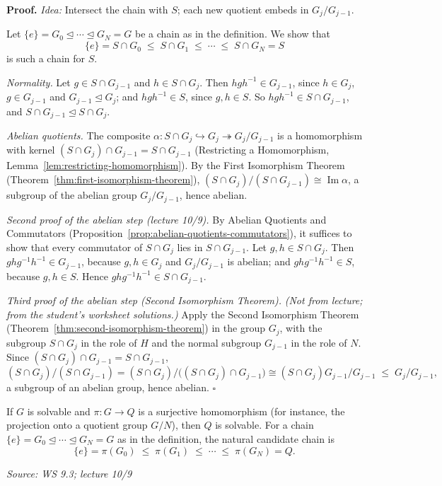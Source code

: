 \documentclass[11pt]{report}
\renewenvironment{proof}[1][Proof]{\noindent\textbf{#1.} }{\hfill$\square$\par\vspace{5pt}}
\newcommand{\srcline}[1]{\par\hfill{\footnotesize\textit{Source: #1}}}
\begin{document}
\begin{proof}
\textit{Idea:} Intersect the chain with $S$; each new quotient embeds in $G_j/G_{j-1}$.\par
Let $\{e\} = G_0 \trianglelefteq \cdots \trianglelefteq G_N = G$ be a chain as in the definition. We show that
\[ \{e\} = S \cap G_0 \;\leq\; S \cap G_1 \;\leq\; \cdots \;\leq\; S \cap G_N = S \]
is such a chain for $S$.

\emph{Normality.} Let $g \in S \cap G_{j-1}$ and $h \in S \cap G_j$. Then $hgh^{-1} \in G_{j-1}$, since $h \in G_j$, $g \in G_{j-1}$ and $G_{j-1} \trianglelefteq G_j$; and $hgh^{-1} \in S$, since $g, h \in S$. So $hgh^{-1} \in S \cap G_{j-1}$, and $S \cap G_{j-1} \trianglelefteq S \cap G_j$.

\emph{Abelian quotients.} The composite $\alpha: S \cap G_j \hookrightarrow G_j \twoheadrightarrow G_j/G_{j-1}$ is a homomorphism with kernel $(S \cap G_j) \cap G_{j-1} = S \cap G_{j-1}$ (Restricting a Homomorphism, Lemma~\ref{lem:restricting-homomorphism}). By the First Isomorphism Theorem (Theorem~\ref{thm:first-isomorphism-theorem}), $(S \cap G_j)/(S \cap G_{j-1}) \cong \operatorname{Im}\alpha$, a subgroup of the abelian group $G_j/G_{j-1}$, hence abelian.

\emph{Second proof of the abelian step (lecture 10/9).} By Abelian Quotients and Commutators (Proposition~\ref{prop:abelian-quotients-commutators}), it suffices to show that every commutator of $S \cap G_j$ lies in $S \cap G_{j-1}$. Let $g, h \in S \cap G_j$. Then $ghg^{-1}h^{-1} \in G_{j-1}$, because $g, h \in G_j$ and $G_j/G_{j-1}$ is abelian; and $ghg^{-1}h^{-1} \in S$, because $g, h \in S$. Hence $ghg^{-1}h^{-1} \in S \cap G_{j-1}$.

\emph{Third proof of the abelian step (Second Isomorphism Theorem).} \textit{(Not from lecture; from the student's worksheet solutions.)} Apply the Second Isomorphism Theorem (Theorem~\ref{thm:second-isomorphism-theorem}) in the group $G_j$, with the subgroup $S \cap G_j$ in the role of $H$ and the normal subgroup $G_{j-1}$ in the role of $N$. Since $(S \cap G_j) \cap G_{j-1} = S \cap G_{j-1}$,
\[ (S \cap G_j)/(S \cap G_{j-1}) = (S \cap G_j)\big/\big((S \cap G_j) \cap G_{j-1}\big) \cong (S \cap G_j)G_{j-1}/G_{j-1} \;\leq\; G_j/G_{j-1}, \]
a subgroup of an abelian group, hence abelian.
\end{proof}

\begin{propbox}\label{prop:quotients-solvable}
If $G$ is solvable and $\pi: G \to Q$ is a surjective homomorphism (for instance, the projection onto a quotient group $G/N$), then $Q$ is solvable. For a chain $\{e\} = G_0 \trianglelefteq \cdots \trianglelefteq G_N = G$ as in the definition, the natural candidate chain is
\[ \{e\} = \pi(G_0) \;\leq\; \pi(G_1) \;\leq\; \cdots \;\leq\; \pi(G_N) = Q. \]
\srcline{WS 9.3; lecture 10/9}
\end{propbox}
\end{document}
